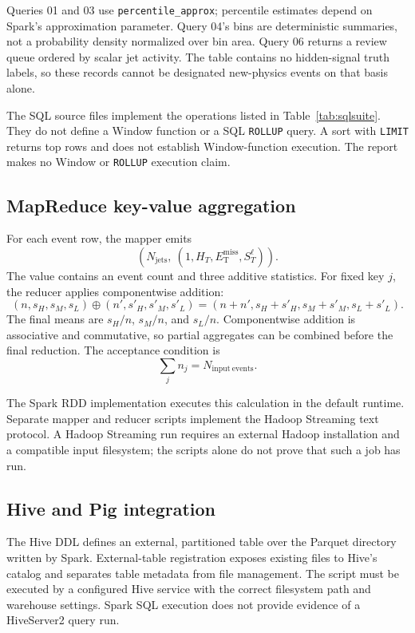 \documentclass[11pt,a4paper]{article}
\newcommand{\met}{E_{\mathrm{T}}^{\mathrm{miss}}}
\newcommand{\HT}{H_{T}}
\newcommand{\STlep}{S_{T}^{\ell}}
\newcommand{\njet}{N_{\mathrm{jets}}}
\begin{document}
Queries 01 and 03 use \texttt{percentile\_approx}; percentile estimates depend on Spark's approximation parameter. Query 04's bins are deterministic summaries, not a probability density normalized over bin area. Query 06 returns a review queue ordered by scalar jet activity. The table contains no hidden-signal truth labels, so these records cannot be designated new-physics events on that basis alone.

The SQL source files implement the operations listed in Table~\ref{tab:sqlsuite}. They do not define a Window function or a SQL \texttt{ROLLUP} query. A sort with \texttt{LIMIT} returns top rows and does not establish Window-function execution. The report makes no Window or \texttt{ROLLUP} execution claim.

\subsection{MapReduce key-value aggregation}

For each event row, the mapper emits
\begin{equation}\left(\njet,\ (1,\HT,\met,\STlep)\right).\end{equation}
The value contains an event count and three additive statistics. For fixed key \(j\), the reducer applies componentwise addition:
\begin{equation}
(n,s_H,s_M,s_L)\oplus(n',s'_H,s'_M,s'_L)=(n+n',s_H+s'_H,s_M+s'_M,s_L+s'_L).
\end{equation}
The final means are \(s_H/n\), \(s_M/n\), and \(s_L/n\). Componentwise addition is associative and commutative, so partial aggregates can be combined before the final reduction. The acceptance condition is
\begin{equation}\sum_j n_j=N_{\mathrm{input\ events}}.\end{equation}

The Spark RDD implementation executes this calculation in the default runtime. Separate mapper and reducer scripts implement the Hadoop Streaming text protocol. A Hadoop Streaming run requires an external Hadoop installation and a compatible input filesystem; the scripts alone do not prove that such a job has run.

\subsection{Hive and Pig integration}

The Hive DDL defines an external, partitioned table over the Parquet directory written by Spark. External-table registration exposes existing files to Hive's catalog and separates table metadata from file management. The script must be executed by a configured Hive service with the correct filesystem path and warehouse settings. Spark SQL execution does not provide evidence of a HiveServer2 query run.
\end{document}
